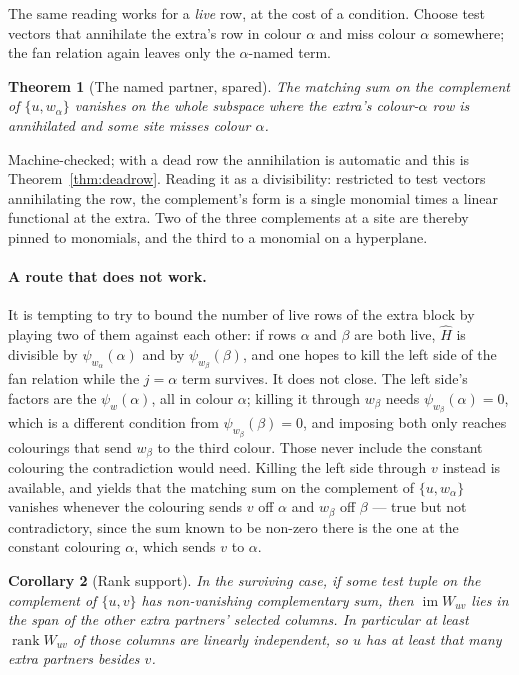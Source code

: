 \documentclass[11pt]{article}
\newtheorem{theorem}{Theorem}[section]
\newtheorem{corollary}[theorem]{Corollary}
\theoremstyle{definition}
\theoremstyle{remark}
\begin{document}
The same reading works for a \emph{live} row, at the cost of a condition. Choose test vectors
that annihilate the extra's row in colour $\alpha$ and miss colour $\alpha$ somewhere; the fan
relation again leaves only the $\alpha$-named term.

\begin{theorem}[The named partner, spared]\label{thm:namedspared}
The matching sum on the complement of $\{u, w_\alpha\}$ vanishes on the whole subspace where
the extra's colour-$\alpha$ row is annihilated and some site misses colour $\alpha$.
\end{theorem}

Machine-checked; with a dead row the annihilation is automatic and this is
Theorem~\ref{thm:deadrow}. Reading it as a divisibility: restricted to test vectors
annihilating the row, the complement's form is a single monomial times a linear functional at
the extra. Two of the three complements at a site are thereby pinned to monomials, and the
third to a monomial on a hyperplane.

\paragraph{A route that does not work.} It is tempting to try to bound the number of live
rows of the extra block by playing two of them against each other: if rows $\alpha$ and
$\beta$ are both live, $\hat H$ is divisible by $\psi_{w_\alpha}(\alpha)$ and by
$\psi_{w_\beta}(\beta)$, and one hopes to kill the left side of the fan relation while the
$j = \alpha$ term survives. It does not close. The left side's factors are the
$\psi_w(\alpha)$, all in colour $\alpha$; killing it through $w_\beta$ needs
$\psi_{w_\beta}(\alpha) = 0$, which is a different condition from
$\psi_{w_\beta}(\beta) = 0$, and imposing both only reaches colourings that send $w_\beta$ to
the third colour. Those never include the constant colouring the contradiction would need.
Killing the left side through $v$ instead is available, and yields that the matching sum on
the complement of $\{u,w_\alpha\}$ vanishes whenever the colouring sends $v$ off $\alpha$ and
$w_\beta$ off $\beta$ --- true but not contradictory, since the sum known to be non-zero
there is the one at the constant colouring $\alpha$, which sends $v$ to $\alpha$.

\begin{corollary}[Rank support]\label{cor:triple}
In the surviving case, if some test tuple on the complement of $\{u,v\}$ has non-vanishing
complementary sum, then $\operatorname{im} W_{uv}$ lies in the span of the other extra
partners' selected columns. In particular at least $\operatorname{rank} W_{uv}$ of those
columns are linearly independent, so $u$ has at least that many extra partners besides
$v$.
\end{corollary}
\end{document}

